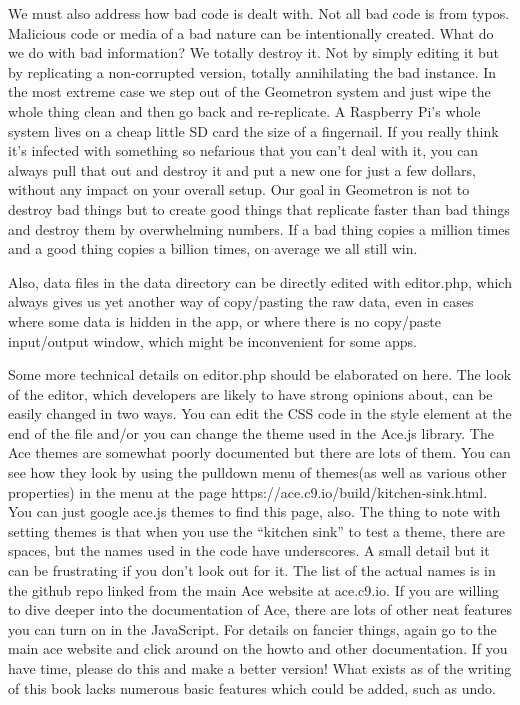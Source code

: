 We must also address how bad code is dealt with.  Not all bad code is from typos.  Malicious code or media of a bad nature can be intentionally created. What do we do with bad information? We totally destroy it.  Not by simply editing it but by replicating a non-corrupted version, totally annihilating the bad instance.  In the most extreme case we step out of the Geometron system and just wipe the whole thing clean and then go back and re-replicate.  A Raspberry Pi's whole system lives on a cheap little SD card the size of a fingernail.  If you really think it's infected with something so nefarious that you can't deal with it, you can always pull that out and destroy it and put a new one for just a few dollars, without any impact on your overall setup.  Our goal in Geometron is not to destroy bad things but to create good things that replicate faster than bad things and destroy them by overwhelming numbers.  If a bad thing copies a million times and a good thing copies a billion times, on average we all still win.  

Also, data files in the data directory can be directly edited with editor.php, which always gives us yet another way of copy/pasting the raw data, even in cases where some data is hidden in the app, or where there is no copy/paste input/output window, which might be inconvenient for some apps.

Some more technical details on editor.php should be elaborated on here.  The look of the editor, which developers are likely to have strong opinions about, can be easily changed in two ways.  You can edit the CSS code in the style element at the end of the file and/or you can change the theme used in the Ace.js library.  The Ace themes are somewhat poorly documented but there are lots of them.  You can see how they look by using the pulldown menu of themes(as well as various other properties) in the menu at the page https://ace.c9.io/build/kitchen-sink.html. You can just google ace.js themes to find this page, also.  The thing to note with setting themes is that when you use the ``kitchen sink'' to test a theme, there are spaces, but the names used in the code have underscores.  A small detail but it can be frustrating if you don't look out for it.  The list of the actual names is in the github repo linked from the main Ace website at ace.c9.io.  If you are willing to dive deeper into the documentation of Ace, there are lots of other neat features you can turn on in the JavaScript.  For details on fancier things, again go to the main ace website and click around on the howto and other documentation.  If you have time, please do this and make a better version! What exists as of the writing of this book lacks numerous basic features which could be added, such as undo.

